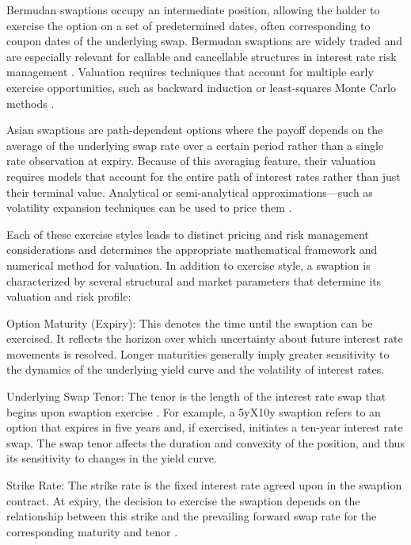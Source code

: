 Bermudan swaptions occupy an intermediate position, allowing the holder to exercise the option on a set of predetermined dates, often corresponding to coupon dates of the underlying swap. Bermudan swaptions are widely traded \parencite{karlsson2016exercisepolicies} and are especially relevant for callable and cancellable structures in interest rate risk management \parencite[p.~22]{rebonato2004interest}. Valuation requires techniques that account for multiple early exercise opportunities, such as backward induction \parencite{karlsson2016exercisepolicies} or least-squares Monte Carlo methods \parencite{longstaff2001valuingamericanoptions}.

Asian swaptions are path-dependent options where the payoff depends on the average of the underlying swap rate over a certain period rather than a single rate observation at expiry. Because of this averaging feature, their valuation requires models that account for the entire path of interest rates rather than just their terminal value. Analytical or semi-analytical approximations—such as volatility expansion techniques can be used to price them \parencite{baaquie2010asianswaptions}.

Each of these exercise styles leads to distinct pricing and risk management considerations and determines the appropriate mathematical framework and numerical method for valuation. In addition to exercise style, a swaption is characterized by several structural and market parameters that determine its valuation and risk profile:

Option Maturity (Expiry): This denotes the time until the swaption can be exercised. It reflects the horizon over which uncertainty about future interest rate movements is resolved. Longer maturities generally imply greater sensitivity to the dynamics of the underlying yield curve and the volatility of interest rates.

Underlying Swap Tenor: The tenor is the length of the interest rate swap that begins upon swaption exercise \parencite[p.~19]{brigo2006interest}. For example, a 5yX10y swaption refers to an option that expires in five years and, if exercised, initiates a ten-year interest rate swap. The swap tenor affects the duration and convexity of the position, and thus its sensitivity to changes in the yield curve.

Strike Rate: The strike rate is the fixed interest rate agreed upon in the swaption contract. At expiry, the decision to exercise the swaption depends on the relationship between this strike and the prevailing forward swap rate for the corresponding maturity and tenor \parencite[p.~239]{brigo2006interest}.

